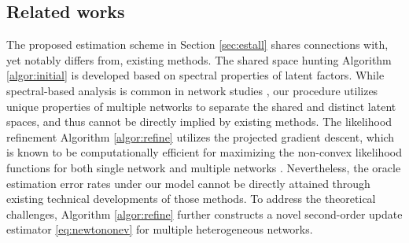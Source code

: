 \documentclass[12pt]{article}
\begin{document}
\subsection{Related works}
The proposed estimation scheme in Section \ref{sec:estall}  shares connections with, yet notably differs from, existing methods.  
The shared space hunting Algorithm \ref{algor:initial} is developed based on spectral properties of latent factors. While spectral-based analysis is common in  network studies  
\citep{rohe2011spectral,chatterjee2015matrix,arroyo2021inference}, 
our procedure utilizes unique properties of multiple networks to separate the shared and distinct  latent spaces, and thus cannot be directly implied by existing methods.
The likelihood refinement Algorithm \ref{algor:refine} utilizes the projected gradient descent, 
which is known to be computationally efficient for maximizing  the non-convex likelihood functions 
for both single network \citep{ma2020universal} and multiple networks \citep{zhang2020flexible}.
Nevertheless, the oracle estimation error rates under our model cannot be directly attained through  existing  technical developments of those methods. %
To address the theoretical challenges, Algorithm  \ref{algor:refine} 
further constructs a novel second-order update estimator  \eqref{eq:newtononev} for multiple heterogeneous networks. 
\end{document}
